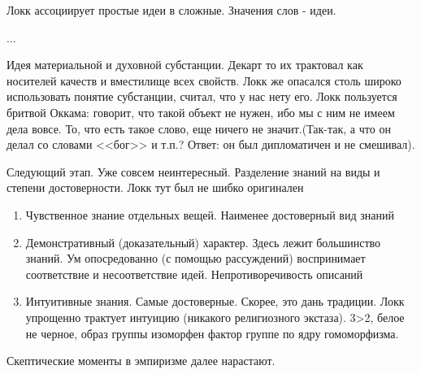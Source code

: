 Локк ассоциирует простые идеи в сложные. Значения слов - идеи.

...

Идея материальной и духовной субстанции. Декарт то их трактовал как носителей качеств и вместилище всех свойств. Локк же опасался столь широко использовать понятие субстанции, считал, что у нас нету его. Локк пользуется бритвой Оккама: говорит, что такой объект не нужен, ибо мы с ним не имеем дела вовсе. То, что есть такое слово, еще ничего не значит.(Так-так, а что он делал со словами <<бог>> и т.п.? Ответ: он был дипломатичен и не смешивал).

Следующий этап. Уже совсем неинтересный. Разделение знаний на виды и степени достоверности. Локк тут был не шибко оригинален

\begin{enumerate}
	\item Чувственное знание отдельных вещей.  Наименее достоверный вид знаний
	\item Демонстративный (доказательный) характер. Здесь лежит большинство знаний. Ум опосредованно (с помощью рассуждений) воспринимает соответствие и несоответствие идей. Непротиворечивость описаний
	\item Интуитивные знания. Самые достоверные. Скорее, это дань традиции. Локк упрощенно трактует интуицию (никакого религиозного экстаза). 3>2, белое не черное, образ группы изоморфен фактор группе по ядру гомоморфизма.
\end{enumerate}
	
Скептические моменты в эмпиризме далее нарастают.
